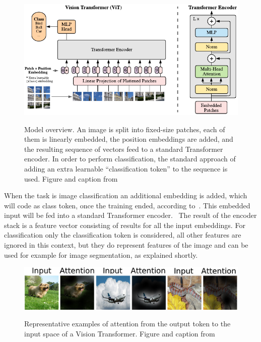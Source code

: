 \begin{figure}[!t]
    \centering
    \includegraphics[width=\textwidth]{pictures/vit}\\
    \caption[Vision Transformer model structure]{Model overview. An image is split into fixed-size patches, each of them is linearly embedded, the position embeddings are added, and the resulting sequence of vectors feed to a standard Transformer encoder. In order to perform classification, the standard approach of adding an extra learnable “classification token” to the sequence is used. Figure and caption from~\autocite{Dosovitskiy2021}}
    \label{fig:vit}
\end{figure}

When the task is image classification an additional embedding is added, which will code as class token, once the training ended, according to~\autocite{Devlin2019}.
This embedded input will be fed into a standard Transformer encoder.~\autocite{Dosovitskiy2021}
The result of the encoder stack is a feature vector consisting of results for all the input embeddings.
For classification only the classification token is considered, all other features are ignored in this context, but they do represent features of the image and can be used for example for image segmentation, as explained shortly.

\begin{figure}[!t]
    \centering
    \includegraphics[width=\textwidth]{pictures/vit-attention2}\\
    \caption[Examples of attention in Vision Transformers]{Representative examples of attention from the output token to the input space of a Vision Transformer. Figure and caption from~\autocite{Dosovitskiy2021}}
    \label{fig:vit-attention}
\end{figure}

